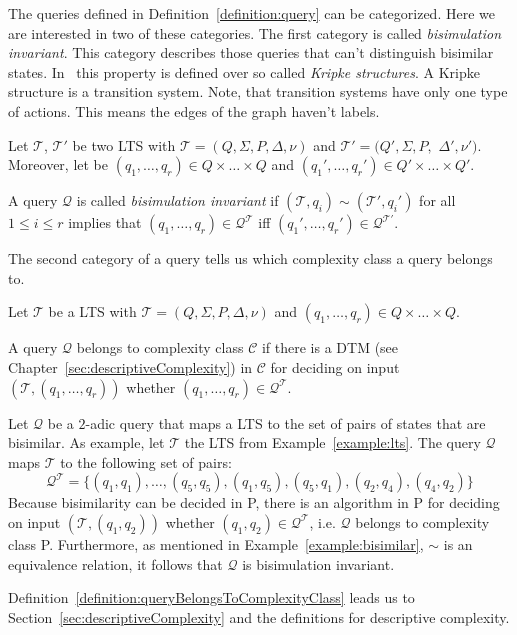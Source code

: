 The queries defined in Definition~\ref{definition:query} can be categorized. Here we are interested in two of these
categories. The first category is called \textit{bisimulation invariant}. This category describes those queries that
can't distinguish bisimilar states. In~\cite{otto1999bisimulation} this property is defined over so called
\textit{Kripke structures}. A Kripke structure
is a transition system. Note, that transition systems  have only one type of actions. This means the edges of the
graph haven't labels.

\begin{definition}
    \label{definition:bisimulationInvariant}
    Let $\mathcal{T}$, $\mathcal{T}'$ be two LTS with $\mathcal{T} = (Q, \Sigma, P, \Delta, \nu)$
    and $\mathcal{T}' = (Q', \Sigma, P,$ $ \Delta', \nu')$. Moreover, let be $(q_1, \dots, q_r) \in Q \times \dots
    \times Q$ and $({q_1}', \dots, {q_r}') \in Q' \times \dots \times Q'$.

    A query $\mathcal{Q}$ is called \emph{bisimulation invariant} if $(\mathcal{T}, q_i) \sim (\mathcal{T}', q_i')$
    for all $1 \leq i \leq r$ implies that $(q_1, \dots, q_r) \in \mathcal{Q}^\mathcal{T}$ iff $({q_1}',
    \dots, {q_r}') \in \mathcal{Q}^{{\mathcal{T}}'}$.
\end{definition}

The second category of a query tells us which complexity class a query belongs to.

\begin{definition}
    \label{definition:queryBelongsToComplexityClass}
    Let $\mathcal{T}$ be a LTS with $\mathcal{T} = (Q, \Sigma, P, \Delta, \nu)$ and $(q_1, \dots, q_{r}) \in Q \times
    \dots \times Q$.

    A query $\mathcal{Q}$ belongs to complexity class $\mathcal{C}$ if there is a DTM (see
    Chapter~\ref{sec:descriptiveComplexity}) in $\mathcal{C}$ for deciding on input $(\mathcal{T}, (q_1, \dots,
    q_{r}))$ whether $(q_1, \dots, q_{r}) \in \mathcal{Q}^\mathcal{T}$.
\end{definition}

\begin{example}{\cite{lange2014capturing}}
    Let $\mathcal{Q}$ be a $2$-adic query that maps a LTS to the set of pairs of states that are bisimilar. As
    example, let $\mathcal{T}$ the LTS from Example~\ref{example:lts}. The query $\mathcal{Q}$ maps $\mathcal{T}$ to
    the following set of pairs:
    \[\mathcal{Q}^\mathcal{T} = \{(q_1, q_1), \dots, (q_5, q_5), (q_1, q_5), (q_5, q_1), (q_2, q_4), (q_4,
    q_2)\}\]
    Because bisimilarity can be decided in P, there is an algorithm in P for deciding on input $(\mathcal{T}, (q_1,
    q_2))$ whether $(q_1, q_2) \in \mathcal{Q}^\mathcal{T}$, i.e. $\mathcal{Q}$ belongs to complexity class P.
    Furthermore, as mentioned in Example~\ref{example:bisimilar}, $\sim$ is an
    equivalence relation, it follows that $\mathcal{Q}$ is bisimulation invariant.
\end{example}

Definition~\ref{definition:queryBelongsToComplexityClass} leads us to Section~\ref{sec:descriptiveComplexity} and
the definitions for descriptive complexity.